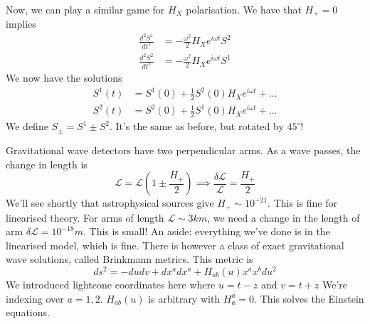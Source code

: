 Now, we can play a similar game for  $ H _ X $ polarisation. 
We have that $ H _ +  = 0 $  implies 
\begin{align*}
	\frac{d ^ 2 S ^ 1 }{ dt ^ 2 } &=   - \frac{\omega ^ 2 }{ 2 } H_ X e ^{ i \omega t } S ^  2  \\ 
	\frac{ d ^  2 S ^ 2 }{ dt ^ 2 } &=   - \frac{\omega ^  2 }{ 2 } H _X e ^{ i \omega t } S ^  1  
\end{align*}
We now have the solutions 
\begin{align*}
	S ^ 1 ( t ) &=  S ^  1( 0 ) + \frac{1}{2 } S ^  2( 0 ) H _X e ^{ i \omega t } + \dots  \\ 
	S ^ 2 ( t ) &=  S ^  2 ( 0 ) + \frac{1}{2 } S ^ 1 ( 0 ) H _ X e ^{ i \omega t} + \dots  
\end{align*}
We define $ S _{ \pm }  = S ^ 1 \pm S ^ 2 $. It's the same 
as before, but rotated by $ 45 ^{ \circ } $!

Gravitational wave detectors have two perpendicular
arms. As a wave passes, the change in length is 
\[
	\mathcal{ L }  = \mathcal{ L } \left( 1 \pm \frac{H _ + }{ 2 }  \right)  \implies \frac{\delta \mathcal{ L } }{ 
	\mathcal{ L } }  = \frac{ H _ + }{ 2 }
\]  We'll see shortly that astrophysical 
sources give $ H _ + \sim 10^{ - 21 } $. This 
is fine for linearised theory. For arms of 
length $ \mathcal{ L } \sim 3 km $, we need a change in 
the length of arm $ \delta \mathcal{ L }  = 10 ^{ - 18 } m  $. 
This is small!
An aside: everything we've done is in the linearised 
model, which is fine. There is however a class 
of exact gravitational wave solutions, called Brinkmann metrics. 
This metric is
\[
	ds ^ 2  = - du dv + dx ^ a dx ^ a + H_{ ab } ( u ) x ^ a x ^ b d u ^  2
\] We introduced lightcone coordinates here where $ u = t - z $ and $ v = t + z $
We're indexing over  $  a = 1, 2 $. $ H_{ ab } ( u ) $ is arbitrary with 
$ H ^ a _ a  = 0 $. 
This solves the Einstein equations. 


